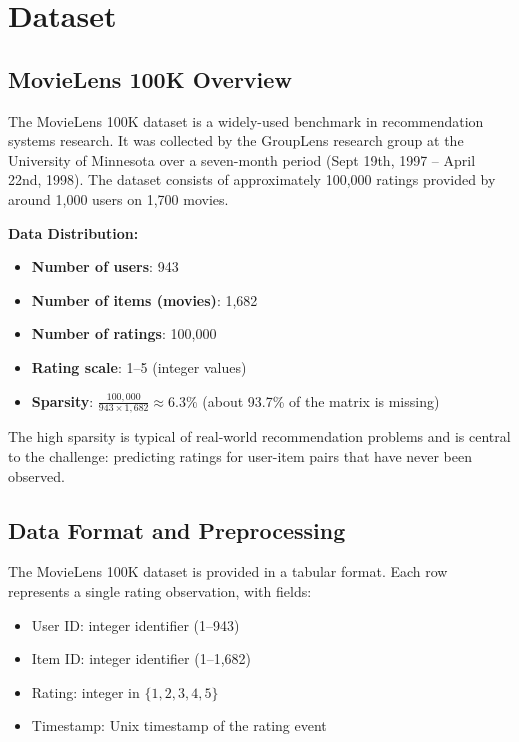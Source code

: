 \section{Dataset}
\label{sec:dataset}

\subsection{MovieLens 100K Overview}

The MovieLens 100K dataset is a widely-used benchmark in recommendation systems research. It was collected 
by the GroupLens research group at the University of Minnesota over a seven-month period (Sept 19th, 1997 -- 
April 22nd, 1998). The dataset consists of approximately 100,000 ratings provided by around 1,000 users on 
1,700 movies.

\textbf{Data Distribution:}
\begin{itemize}
  \item \textbf{Number of users}: 943
  \item \textbf{Number of items (movies)}: 1,682
  \item \textbf{Number of ratings}: 100,000
  \item \textbf{Rating scale}: 1--5 (integer values)
  \item \textbf{Sparsity}: $\frac{100,000}{943 \times 1,682} \approx 6.3\%$ (about 93.7\% of the matrix is missing)
\end{itemize}

The high sparsity is typical of real-world recommendation problems and is central to the challenge: 
predicting ratings for user-item pairs that have never been observed.

\subsection{Data Format and Preprocessing}

The MovieLens 100K dataset is provided in a tabular format. Each row represents a single rating observation, 
with fields:
\begin{itemize}
  \item User ID: integer identifier (1--943)
  \item Item ID: integer identifier (1--1,682)
  \item Rating: integer in $\{1, 2, 3, 4, 5\}$
  \item Timestamp: Unix timestamp of the rating event
\end{itemize}

